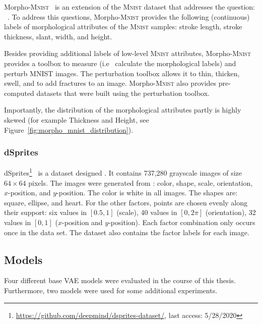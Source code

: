 Morpho-\textsc{Mnist}~\citep{castro2019morpho} is an extension of the \textsc{Mnist} dataset that addresses the question:  ~\citep{castro2019morpho}.
To address this questions, Morpho-\textsc{Mnist} provides the following (continuous) labels of morphological attributes of the \textsc{Mnist} samples: stroke length, stroke thickness, slant, width, and height.

Besides providing additional labels of low-level \textsc{Mnist} attributes, Morpho-\textsc{Mnist} provides a toolbox to measure (i.e~ calculate the morphological labels) and perturb MNIST images.
The perturbation toolbox allows it to thin, thicken, swell, and to add fractures to an image.
Morpho-\textsc{Mnist} also provides pre-computed datasets that were built using the perturbation toolbox.

Importantly, the distribution of the morphological attributes partly is highly skewed (for example Thickness and Height, see Figure~\ref{fig:morpho_mnist_distribution}).

\subsubsection{dSprites}
dSprites\footnote{\href{https://github.com/deepmind/dsprites-dataset/}{https://github.com/deepmind/dsprites-dataset/}, last access: 5/28/2020}~\citep{dsprites17} is a dataset designed .
It contains 737,280 grayscale images of size $64\times 64$ pixels.
The images were generated from : color, shape, scale, orientation, $x$-position, and $y$-position.
The color is white in all images.
The shapes are: square, ellipse, and heart.
For the other factors, points are chosen evenly along their support: six values in $[0.5, 1]$ (scale), 40 values in $[0, 2\pi]$ (orientation), 32 values in $[0, 1]$ ($x$-position and $y$-position).
Each factor combination only occurs once in the data set.
The dataset also contains the factor labels for each image.

\subsection{Models}\label{subsec:models}

Four different base \ac{VAE} models were evaluated in the course of this thesis.
Furthermore, two  models were used for some additional experiments.

